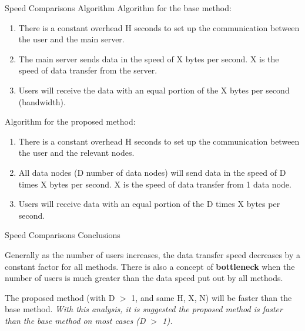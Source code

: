 \documentclass{beamer}
\begin{document}
\begin{frame}{Speed Comparisons Algorithm}
Algorithm for the base method:
    \begin{enumerate}
    \item There is a constant overhead H seconds to set up the communication between the user and the main server.
    \item The main server sends data in the speed of X bytes per second. X is the speed of data transfer from the server.
    \item Users will receive the data with an equal portion of the X bytes per second (bandwidth).
    \end{enumerate}
    
Algorithm for the proposed method:
    \begin{enumerate}
    \item There is a constant overhead H seconds to set up the communication between the user and the relevant nodes.
    \item All data nodes (D number of data nodes) will send data in the speed of D times X bytes per second. X is the speed of data transfer from 1 data node.
    \item Users will receive data with an equal portion of the D times X bytes per second.
    \end{enumerate}
\end{frame}

\begin{frame}{Speed Comparisons Conclusions}
    
Generally as the number of users increases, the data transfer speed decreases by a constant factor for all methods. There is also a concept of \textbf{bottleneck} when the number of users is much greater than the data speed put out by all methods.

The proposed method (with D $>$ 1, and same H, X, N) will be faster than the base method. \textit{With this analysis, it is suggested the proposed method is faster than the base method on most cases (D $>$ 1). }
\end{frame}
\end{document}
